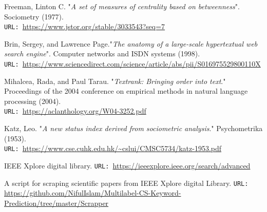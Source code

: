 \documentclass[12pt]{article}
\numberwithin{equation}{section}
\begin{document}
\begin{spacing}{1.5}
\begin{thebibliography}{8}
		Freeman, Linton C. "\textit{A set of measures of centrality based on betweenness}". Sociometry (1977). \\
		\texttt{URL: }\url{https://www.jstor.org/stable/3033543?seq=7}
		
		Brin, Sergey, and Lawrence Page."\textit{The anatomy of a large-scale hypertextual web search engine}". Computer networks and ISDN systems (1998). \\
		\texttt{URL: }\url{https://www.sciencedirect.com/science/article/abs/pii/S016975529800110X}
		
		Mihalcea, Rada, and Paul Tarau. "\textit{Textrank: Bringing order into text}." Proceedings of the 2004 conference on empirical methods in natural language processing (2004). \\
		\texttt{URL: }\url{https://aclanthology.org/W04-3252.pdf}
		
		Katz, Leo. "\textit{A new status index derived from sociometric analysis}." Psychometrika (1953). \\
		\texttt{URL: }\url{https://www.cse.cuhk.edu.hk/~cslui/CMSC5734/katz-1953.pdf}
		
		IEEE Xplore digital library.
		\texttt{URL: }\url{https://ieeexplore.ieee.org/search/advanced}
		
		A script for scraping scientific papers from IEEE Xplore digital Library.
		\texttt{URL: }\url{https://github.com/NifulIslam/Multilabel-CS-Keyword-Prediction/tree/master/Scrapper}
		
		
		
	\end{thebibliography}

	\end{spacing}
	
\end{document}
